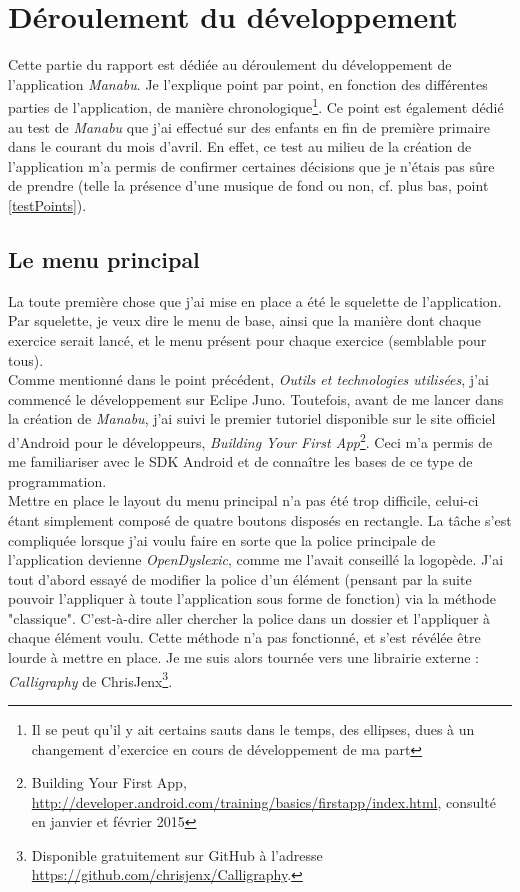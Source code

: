 \section{Déroulement du développement}
Cette partie du rapport est dédiée au déroulement du développement de l'application \textit{Manabu}. Je l'explique point par point, en fonction des différentes parties de l'application, de manière chronologique\footnote{Il se peut qu'il y ait certains sauts dans le temps, des ellipses, dues à un changement d'exercice en cours de développement de ma part}. Ce point est également dédié au test de \textit{Manabu} que j'ai effectué sur des enfants en fin de première primaire dans le courant du mois d'avril. En effet, ce test au milieu de la création de l'application m'a permis de confirmer certaines décisions que je n'étais pas sûre de prendre (telle la présence d'une musique de fond ou non, cf. plus bas, point \ref{testPoints}). 

\subsection{Le menu principal}
La toute première chose que j'ai mise en place a été le squelette de l'application. Par squelette, je veux dire le menu de base, ainsi que la manière dont chaque exercice serait lancé, et le menu présent pour chaque exercice (semblable pour tous). \\

Comme mentionné dans le point précédent, \textit{Outils et technologies utilisées}, j'ai commencé le développement sur Eclipe Juno. Toutefois, avant de me lancer dans la création de \textit{Manabu}, j'ai suivi le premier tutoriel disponible sur le site officiel d'Android pour le développeurs, \textit{Building Your First App}\footnote{Building Your First App, \url{http://developer.android.com/training/basics/firstapp/index.html}, consulté en janvier et février 2015}. Ceci m'a permis de me familiariser avec le SDK Android et de connaître les bases de ce type de programmation.\\

Mettre en place le layout du menu principal n'a pas été trop difficile, celui-ci étant simplement composé de quatre boutons disposés en rectangle. La tâche s'est compliquée lorsque j'ai voulu faire en sorte que la police principale de l'application devienne \textit{OpenDyslexic}, comme me l'avait conseillé la logopède. J'ai tout d'abord essayé de modifier la police d'un élément (pensant par la suite pouvoir l'appliquer à toute l'application sous forme de fonction) via la méthode "classique". C'est-à-dire aller chercher la police dans un dossier et l'appliquer à chaque élément voulu. Cette méthode n'a pas fonctionné, et s'est révélée être lourde à mettre en place. Je me suis alors tournée vers une librairie externe : \textit{Calligraphy} de ChrisJenx\footnote{Disponible gratuitement sur GitHub à l'adresse \url{https://github.com/chrisjenx/Calligraphy}.}.\\

